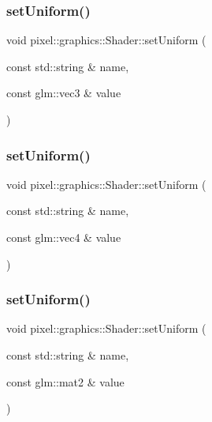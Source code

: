 \subsubsection{\texorpdfstring{set\+Uniform()}{setUniform()}\hspace{0.1cm}{\footnotesize\ttfamily [9/13]}}
{\footnotesize\ttfamily void pixel\+::graphics\+::\+Shader\+::set\+Uniform (\begin{DoxyParamCaption}\item[{const std\+::string \&}]{name,  }\item[{const glm\+::vec3 \&}]{value }\end{DoxyParamCaption})}

\mbox{\label{classpixel_1_1graphics_1_1_shader_ad6cf7896a1994a28741df557237b1180}} 
\subsubsection{\texorpdfstring{set\+Uniform()}{setUniform()}\hspace{0.1cm}{\footnotesize\ttfamily [10/13]}}
{\footnotesize\ttfamily void pixel\+::graphics\+::\+Shader\+::set\+Uniform (\begin{DoxyParamCaption}\item[{const std\+::string \&}]{name,  }\item[{const glm\+::vec4 \&}]{value }\end{DoxyParamCaption})}

\mbox{\label{classpixel_1_1graphics_1_1_shader_addce0cb5dcfbbe52884655ad8018dff2}} 
\subsubsection{\texorpdfstring{set\+Uniform()}{setUniform()}\hspace{0.1cm}{\footnotesize\ttfamily [11/13]}}
{\footnotesize\ttfamily void pixel\+::graphics\+::\+Shader\+::set\+Uniform (\begin{DoxyParamCaption}\item[{const std\+::string \&}]{name,  }\item[{const glm\+::mat2 \&}]{value }\end{DoxyParamCaption})}

